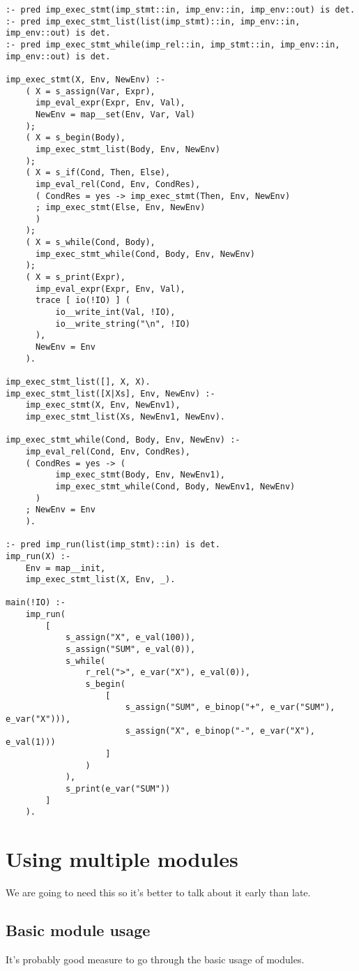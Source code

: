 \begin{lstlisting}[language=Mercury]
:- pred imp_exec_stmt(imp_stmt::in, imp_env::in, imp_env::out) is det.
:- pred imp_exec_stmt_list(list(imp_stmt)::in, imp_env::in, imp_env::out) is det.
:- pred imp_exec_stmt_while(imp_rel::in, imp_stmt::in, imp_env::in, imp_env::out) is det.

imp_exec_stmt(X, Env, NewEnv) :-
	( X = s_assign(Var, Expr),
	  imp_eval_expr(Expr, Env, Val),
	  NewEnv = map__set(Env, Var, Val)
	);
	( X = s_begin(Body),
	  imp_exec_stmt_list(Body, Env, NewEnv)
	);
	( X = s_if(Cond, Then, Else),
	  imp_eval_rel(Cond, Env, CondRes),
	  ( CondRes = yes -> imp_exec_stmt(Then, Env, NewEnv)
	  ; imp_exec_stmt(Else, Env, NewEnv)
	  )
	);
	( X = s_while(Cond, Body),
	  imp_exec_stmt_while(Cond, Body, Env, NewEnv)
	);
	( X = s_print(Expr),
	  imp_eval_expr(Expr, Env, Val),
	  trace [ io(!IO) ] (
		  io__write_int(Val, !IO),
		  io__write_string("\n", !IO)
	  ),
	  NewEnv = Env
	).

imp_exec_stmt_list([], X, X).
imp_exec_stmt_list([X|Xs], Env, NewEnv) :-
	imp_exec_stmt(X, Env, NewEnv1),
	imp_exec_stmt_list(Xs, NewEnv1, NewEnv).

imp_exec_stmt_while(Cond, Body, Env, NewEnv) :-
	imp_eval_rel(Cond, Env, CondRes),
	( CondRes = yes -> (
		  imp_exec_stmt(Body, Env, NewEnv1),
		  imp_exec_stmt_while(Cond, Body, NewEnv1, NewEnv)
	  )
	; NewEnv = Env
	).

:- pred imp_run(list(imp_stmt)::in) is det.
imp_run(X) :-
	Env = map__init,
	imp_exec_stmt_list(X, Env, _).
	
main(!IO) :-
	imp_run(
		[
			s_assign("X", e_val(100)),
			s_assign("SUM", e_val(0)),
			s_while(
				r_rel(">", e_var("X"), e_val(0)),
				s_begin(
					[
						s_assign("SUM", e_binop("+", e_var("SUM"), e_var("X"))),
						s_assign("X", e_binop("-", e_var("X"), e_val(1)))
					]
				)
			),
			s_print(e_var("SUM"))
		]
	).
\end{lstlisting}

\section{Using multiple modules}

We are going to need this so it's better to talk about it early than late.

\subsection{Basic module usage}

It's probably good measure to go through the basic usage of modules.

